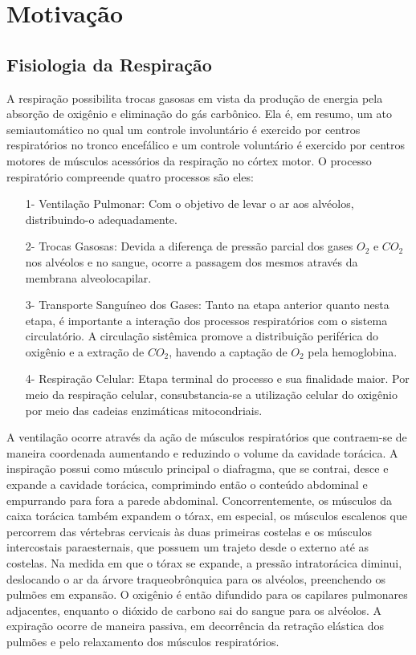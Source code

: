 \chapter{Motivação}
  
\section{Fisiologia da Respiração} \label{sec:fisiologiadarespiracao}

	A respiração possibilita trocas gasosas em vista da produção de energia pela absorção de oxigênio e eliminação do gás carbônico. Ela é, em resumo, um ato semiautomático no qual um controle involuntário é exercido por centros respiratórios no tronco encefálico e um controle voluntário é exercido por centros motores de músculos acessórios da respiração no córtex motor. O processo respiratório compreende quatro processos \cite{porto2014} são eles:
	
	\begin{itemize}
		\item [1-] Ventilação Pulmonar: Com o objetivo de levar o ar aos alvéolos, distribuindo-o adequadamente.
		\item [2-] Trocas Gasosas: Devida a diferença de pressão parcial dos gases $O_2$ e $CO_2$ nos alvéolos e no sangue, ocorre a passagem dos mesmos através da membrana alveolocapilar.
		\item [3-] Transporte Sanguíneo dos Gases: Tanto na etapa anterior quanto nesta etapa, é importante a interação dos processos respiratórios com o sistema circulatório. A circulação sistêmica promove a distribuição periférica do oxigênio e a extração de $CO_2$, havendo a captação de $O_2$ pela hemoglobina.
		\item [4-] Respiração Celular: Etapa terminal do processo e sua finalidade maior. Por meio da respiração celular, consubstancia-se a utilização celular
		do oxigênio por meio das cadeias enzimáticas mitocondriais.
	\end{itemize}
	
	A ventilação ocorre através da ação de músculos respiratórios que contraem-se de maneira coordenada aumentando e reduzindo o volume da cavidade torácica. A inspiração possui como músculo principal o diafragma, que se contrai, desce e expande a cavidade torácica, comprimindo então o conteúdo abdominal e empurrando para fora a parede abdominal. Concorrentemente, os músculos da caixa torácica também expandem o tórax, em especial, os músculos escalenos que percorrem das vértebras cervicais às duas primeiras costelas e os músculos intercostais paraesternais, que possuem um trajeto desde o externo até as costelas. Na medida em que o tórax se expande, a pressão intratorácica diminui, deslocando o ar da árvore traqueobrônquica para os alvéolos, preenchendo os pulmões em expansão. O oxigênio é então difundido para os capilares pulmonares adjacentes, enquanto o dióxido de carbono sai do sangue para os alvéolos. A expiração ocorre de maneira passiva, em decorrência da retração elástica dos pulmões e pelo relaxamento dos músculos respiratórios.
	
